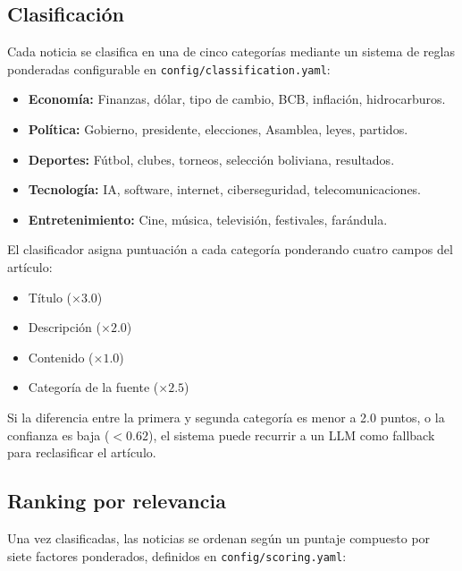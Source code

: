 \subsection{Clasificaci\'on}

Cada noticia se clasifica en una de cinco categor\'ias mediante un sistema de reglas ponderadas configurable en \texttt{config/classification.yaml}:

\begin{itemize}[nosep]
    \item \textbf{Econom\'ia:} Finanzas, d\'olar, tipo de cambio, BCB, inflaci\'on, hidrocarburos.
    \item \textbf{Pol\'itica:} Gobierno, presidente, elecciones, Asamblea, leyes, partidos.
    \item \textbf{Deportes:} F\'utbol, clubes, torneos, selecci\'on boliviana, resultados.
    \item \textbf{Tecnolog\'ia:} IA, software, internet, ciberseguridad, telecomunicaciones.
    \item \textbf{Entretenimiento:} Cine, m\'usica, televisi\'on, festivales, far\'andula.
\end{itemize}

El clasificador asigna puntuaci\'on a cada categor\'ia ponderando cuatro campos del art\'iculo:
\begin{itemize}[nosep]
    \item T\'itulo ($\times 3.0$)
    \item Descripci\'on ($\times 2.0$)
    \item Contenido ($\times 1.0$)
    \item Categor\'ia de la fuente ($\times 2.5$)
\end{itemize}

Si la diferencia entre la primera y segunda categor\'ia es menor a 2.0 puntos, o la confianza es baja ($<0.62$), el sistema puede recurrir a un LLM como fallback para reclasificar el art\'iculo.

\subsection{Ranking por relevancia}

Una vez clasificadas, las noticias se ordenan seg\'un un puntaje compuesto por siete factores ponderados, definidos en \texttt{config/scoring.yaml}:

